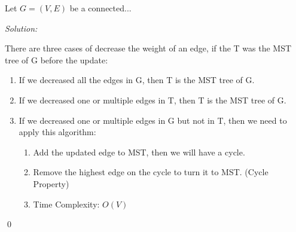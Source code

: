 \documentclass[12pt]{article}
\newenvironment{problem}[2][Problem]{\begin{trivlist}
\item[\hskip \labelsep {\bfseries #1}\hskip \labelsep {\bfseries #2.}]}{\end{trivlist}}
\newenvironment{sol}
    {\emph{Solution:}
    }
    {
    \qed
    }
\begin{document}
\begin{problem}{3} Let $G = (V,E)$ be a connected...
\end{problem}
\begin{sol}
There are three cases of decrease the weight of an edge, if the T was the MST tree of G before the update:

\begin{enumerate}
    \item If we decreased all the edges in G, then T is the MST tree of G.
    \item If we decreased one or multiple edges in T, then T is the MST tree of G.
    \item If we decreased one or multiple edges in G but not in T, then we need to apply this algorithm:
    \begin{enumerate}
        \item Add the updated edge to MST, then we will have a cycle.
        \item Remove the highest edge on the cycle to turn it to MST. (Cycle Property)
        \item Time Complexity: $O(V)$
    \end{enumerate}
\end{enumerate}
\end{sol}
\end{document}
